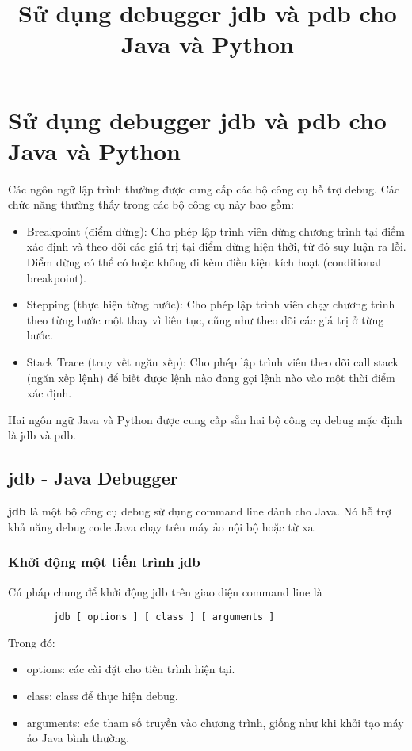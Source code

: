 \documentclass{article}
\title{Sử dụng debugger jdb và pdb cho Java và Python}
\begin{document}
    \section{Sử dụng debugger jdb và pdb cho Java và Python}

    Các ngôn ngữ lập trình thường được cung cấp các bộ công cụ hỗ trợ 
    debug. Các chức năng thường thấy trong các bộ công cụ này bao gồm:
    \begin{itemize}
        \item {Breakpoint (điểm dừng): Cho phép lập trình viên dừng 
        chương trình tại điểm xác định và theo dõi các giá trị tại điểm
        dừng hiện thời, từ đó suy luận ra lỗi. Điểm dừng có thể có hoặc
        không đi kèm điều kiện kích hoạt (conditional breakpoint).}
        \item {Stepping (thực hiện từng bước): Cho phép lập trình viên
        chạy chương trình theo từng bước một thay vì liên tục, cũng như
        theo dõi các giá trị ở từng bước.}
        \item {Stack Trace (truy vết ngăn xếp): Cho phép lập trình viên
        theo dõi call stack (ngăn xếp lệnh) để biết được lệnh nào đang
        gọi lệnh nào vào một thời điểm xác định.}
    \end{itemize}

    Hai ngôn ngữ Java và Python được cung cấp sẵn hai bộ công cụ debug
    mặc định là jdb và pdb.

    \subsection{jdb - Java Debugger}
    \textbf{jdb} là một bộ công cụ debug sử dụng command line dành cho Java.
    Nó hỗ trợ khả năng debug code Java chạy trên máy ảo nội bộ hoặc từ xa.

    \subsubsection{Khởi động một tiến trình jdb}
    Cú pháp chung để khởi động jdb trên giao diện command line là 
    \begin{verbatim}
        jdb [ options ] [ class ] [ arguments ]
    \end{verbatim}
    Trong đó:
    \begin{itemize}
        \item {options: các cài đặt cho tiến trình hiện tại.}
        \item {class: class để thực hiện debug.}
        \item {arguments: các tham số truyền vào chương trình, giống như khi
        khởi tạo máy ảo Java bình thường.}
    \end{itemize}
    
\end{document}
